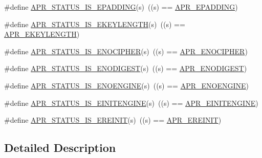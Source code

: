 \begin{DoxyCompactItemize}
\#define \hyperlink{group___a_p_r___util___error_ga4e1e34448470111b935efafda1248628}{A\-P\-R\-\_\-\-S\-T\-A\-T\-U\-S\-\_\-\-I\-S\-\_\-\-E\-P\-A\-D\-D\-I\-N\-G}(s)~((s) == \hyperlink{group___a_p_r___util___error_gae7c077d0539cafc19917c12174ed961d}{A\-P\-R\-\_\-\-E\-P\-A\-D\-D\-I\-N\-G})
\item 
\#define \hyperlink{group___a_p_r___util___error_gab705e1d1975634114d47197609b97cbf}{A\-P\-R\-\_\-\-S\-T\-A\-T\-U\-S\-\_\-\-I\-S\-\_\-\-E\-K\-E\-Y\-L\-E\-N\-G\-T\-H}(s)~((s) == \hyperlink{group___a_p_r___util___error_gabc3c0dcf5954c161df4aff0fb0ce3ae4}{A\-P\-R\-\_\-\-E\-K\-E\-Y\-L\-E\-N\-G\-T\-H})
\item 
\#define \hyperlink{group___a_p_r___util___error_ga8b6a993f66cfa692820018a7a0bf7ee6}{A\-P\-R\-\_\-\-S\-T\-A\-T\-U\-S\-\_\-\-I\-S\-\_\-\-E\-N\-O\-C\-I\-P\-H\-E\-R}(s)~((s) == \hyperlink{group___a_p_r___util___error_ga6b546475980180206e4286e35befaf55}{A\-P\-R\-\_\-\-E\-N\-O\-C\-I\-P\-H\-E\-R})
\item 
\#define \hyperlink{group___a_p_r___util___error_ga13ab217618d8b37c7d85c7c2080908a0}{A\-P\-R\-\_\-\-S\-T\-A\-T\-U\-S\-\_\-\-I\-S\-\_\-\-E\-N\-O\-D\-I\-G\-E\-S\-T}(s)~((s) == \hyperlink{group___a_p_r___util___error_ga93f22e73099e3cd744ea96da38602065}{A\-P\-R\-\_\-\-E\-N\-O\-D\-I\-G\-E\-S\-T})
\item 
\#define \hyperlink{group___a_p_r___util___error_ga9574130dd48e4d76082c7837d052d8d0}{A\-P\-R\-\_\-\-S\-T\-A\-T\-U\-S\-\_\-\-I\-S\-\_\-\-E\-N\-O\-E\-N\-G\-I\-N\-E}(s)~((s) == \hyperlink{group___a_p_r___util___error_gacda8be948c23dbd1347f3302fb1c577f}{A\-P\-R\-\_\-\-E\-N\-O\-E\-N\-G\-I\-N\-E})
\item 
\#define \hyperlink{group___a_p_r___util___error_ga0330ff3219d56b41f702364de38d2a18}{A\-P\-R\-\_\-\-S\-T\-A\-T\-U\-S\-\_\-\-I\-S\-\_\-\-E\-I\-N\-I\-T\-E\-N\-G\-I\-N\-E}(s)~((s) == \hyperlink{group___a_p_r___util___error_ga9d8482ae4b93bdce0f31f120c0511550}{A\-P\-R\-\_\-\-E\-I\-N\-I\-T\-E\-N\-G\-I\-N\-E})
\item 
\#define \hyperlink{group___a_p_r___util___error_ga234e5a708e8d01eb781b4d96f0cc7b05}{A\-P\-R\-\_\-\-S\-T\-A\-T\-U\-S\-\_\-\-I\-S\-\_\-\-E\-R\-E\-I\-N\-I\-T}(s)~((s) == \hyperlink{group___a_p_r___util___error_ga161b8a0f8e24033e8cd5d9068d524f00}{A\-P\-R\-\_\-\-E\-R\-E\-I\-N\-I\-T})
\end{DoxyCompactItemize}


\subsection{Detailed Description}

